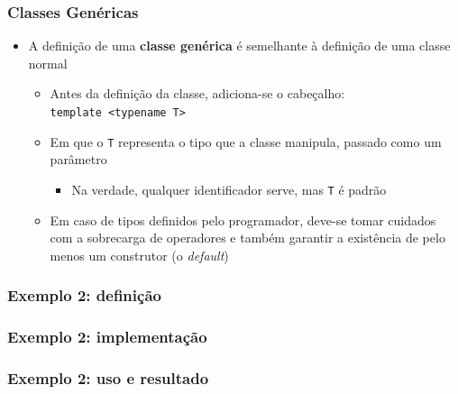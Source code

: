 \documentclass[aspectratio=169]{beamer}
\begin{document}
\begin{frame}\frametitle{Classes Genéricas}
\begin{itemize}
	\item A definição de uma \textbf{classe genérica} é semelhante à definição de uma classe normal
	\begin{itemize}
		\item Antes da definição da classe, adiciona-se o cabeçalho:\\
		\texttt{template \textless{}typename T\textgreater}
		\item Em que o \texttt{T} representa o tipo que a classe manipula, passado como um parâmetro
		\begin{itemize}
			\item Na verdade, qualquer identificador serve, mas \texttt{T} é padrão
		\end{itemize}
		\item Em caso de tipos definidos pelo programador, deve-se tomar cuidados com a sobrecarga de operadores e também garantir a existência de pelo menos um construtor (o \emph{default})
	\end{itemize}
\end{itemize}
	\end{frame}

\begin{frame}[fragile]\frametitle{Exemplo 2: definição}

\end{frame}

\begin{frame}[fragile]\frametitle{Exemplo 2: implementação}

\end{frame}

\begin{frame}[fragile]\frametitle{Exemplo 2: uso e resultado}
\begin{columns}
\begin{column}{0.65\linewidth}

\end{column}
\begin{column}{0.35\linewidth}

\end{column}
\end{columns}
\end{frame}
\end{document}
